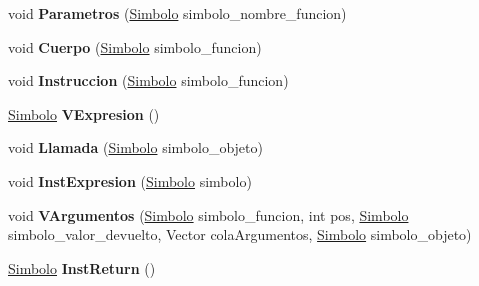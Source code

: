 \begin{DoxyCompactItemize}
\item 
\hypertarget{classcompilationunit_1_1_parser_aac85869621a132ce33080991549f6574}{
void {\bfseries Parametros} (\hyperlink{classcompilationunit_1_1_simbolo}{Simbolo} simbolo\_\-nombre\_\-funcion)}
\label{classcompilationunit_1_1_parser_aac85869621a132ce33080991549f6574}

\item 
\hypertarget{classcompilationunit_1_1_parser_a97c48d888acc7209339902b7e6199b5c}{
void {\bfseries Cuerpo} (\hyperlink{classcompilationunit_1_1_simbolo}{Simbolo} simbolo\_\-funcion)}
\label{classcompilationunit_1_1_parser_a97c48d888acc7209339902b7e6199b5c}

\item 
\hypertarget{classcompilationunit_1_1_parser_ae1917cdf75a7f4c5059d7bcf6305ed07}{
void {\bfseries Instruccion} (\hyperlink{classcompilationunit_1_1_simbolo}{Simbolo} simbolo\_\-funcion)}
\label{classcompilationunit_1_1_parser_ae1917cdf75a7f4c5059d7bcf6305ed07}

\item 
\hypertarget{classcompilationunit_1_1_parser_a8ceb0627560069eb834fa23145c62a15}{
\hyperlink{classcompilationunit_1_1_simbolo}{Simbolo} {\bfseries VExpresion} ()}
\label{classcompilationunit_1_1_parser_a8ceb0627560069eb834fa23145c62a15}

\item 
\hypertarget{classcompilationunit_1_1_parser_a8791aeefd802eb5857e546bce8bdbb82}{
void {\bfseries Llamada} (\hyperlink{classcompilationunit_1_1_simbolo}{Simbolo} simbolo\_\-objeto)}
\label{classcompilationunit_1_1_parser_a8791aeefd802eb5857e546bce8bdbb82}

\item 
\hypertarget{classcompilationunit_1_1_parser_a9b571833499f0afc1a60e7d10ab76d5b}{
void {\bfseries InstExpresion} (\hyperlink{classcompilationunit_1_1_simbolo}{Simbolo} simbolo)}
\label{classcompilationunit_1_1_parser_a9b571833499f0afc1a60e7d10ab76d5b}

\item 
\hypertarget{classcompilationunit_1_1_parser_ab787c2e7997869984fb1b61a6098ecb0}{
void {\bfseries VArgumentos} (\hyperlink{classcompilationunit_1_1_simbolo}{Simbolo} simbolo\_\-funcion, int pos, \hyperlink{classcompilationunit_1_1_simbolo}{Simbolo} simbolo\_\-valor\_\-devuelto, Vector colaArgumentos, \hyperlink{classcompilationunit_1_1_simbolo}{Simbolo} simbolo\_\-objeto)}
\label{classcompilationunit_1_1_parser_ab787c2e7997869984fb1b61a6098ecb0}

\item 
\hypertarget{classcompilationunit_1_1_parser_ab1047a6617694d51dc545edb8af9583d}{
\hyperlink{classcompilationunit_1_1_simbolo}{Simbolo} {\bfseries InstReturn} ()}
\label{classcompilationunit_1_1_parser_ab1047a6617694d51dc545edb8af9583d}


\end{DoxyCompactItemize}
